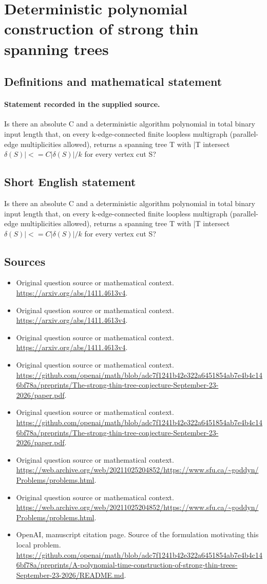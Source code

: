 \documentclass[11pt]{article}
\begin{document}
\section*{Deterministic polynomial construction of strong thin spanning trees}\label{30007078}
\subsection{Definitions and mathematical statement}
\paragraph{Statement recorded in the supplied source.}
Is there an absolute C and a deterministic algorithm polynomial in total binary input length that, on every k-edge-connected finite loopless multigraph (parallel-edge multiplicities allowed), returns a spanning tree T with |T intersect $\delta (S)|<=C|\delta (S)|/k$ for every vertex cut S?
\subsection{Short English statement}
Is there an absolute C and a deterministic algorithm polynomial in total binary input length that, on every k-edge-connected finite loopless multigraph (parallel-edge multiplicities allowed), returns a spanning tree T with |T intersect $\delta (S)|<=C|\delta (S)|/k$ for every vertex cut S?
\subsection{Sources}
\begin{itemize}
\item[S1] Original question source or mathematical context.
\url{https://arxiv.org/abs/1411.4613v4}.
\item[S2] Original question source or mathematical context.
\url{https://arxiv.org/abs/1411.4613v4}.
\item[S3] Original question source or mathematical context.
\url{https://arxiv.org/abs/1411.4613v4}.
\item[S4] Original question source or mathematical context.
\url{https://github.com/openai/math/blob/adc7f1241b42e322a6451854ab7e4b4c146bf78a/preprints/The-strong-thin-tree-conjecture-September-23-2026/paper.pdf}.
\item[S5] Original question source or mathematical context.
\url{https://github.com/openai/math/blob/adc7f1241b42e322a6451854ab7e4b4c146bf78a/preprints/The-strong-thin-tree-conjecture-September-23-2026/paper.pdf}.
\item[S6] Original question source or mathematical context.
\url{https://web.archive.org/web/20211025204852/https://www.sfu.ca/~goddyn/Problems/problems.html}.
\item[S7] Original question source or mathematical context.
\url{https://web.archive.org/web/20211025204852/https://www.sfu.ca/~goddyn/Problems/problems.html}.
\item[S8] OpenAI, manuscript citation page. Source of the formulation motivating this local problem.
\url{https://github.com/openai/math/blob/adc7f1241b42e322a6451854ab7e4b4c146bf78a/preprints/A-polynomial-time-construction-of-strong-thin-trees-September-23-2026/README.md}.
\end{itemize}
\end{document}
